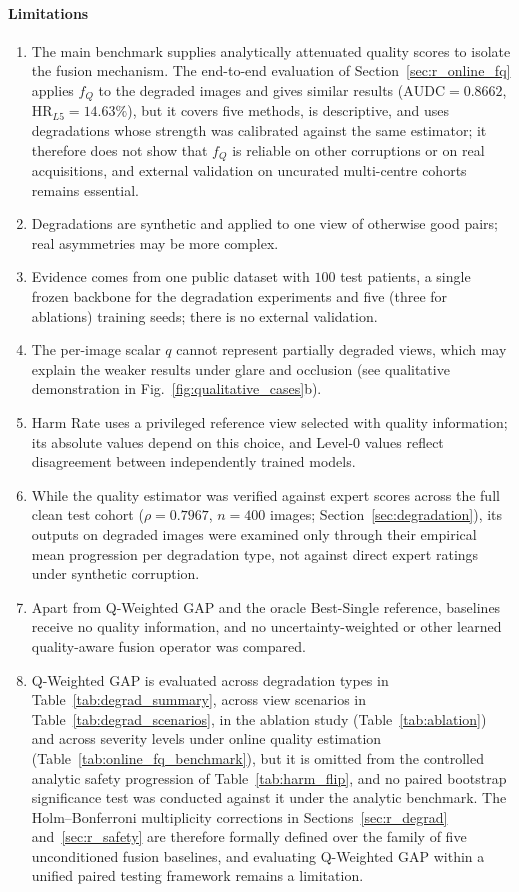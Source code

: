 \documentclass[final,5p,times,twocolumn,authoryear]{elsarticle}
\theoremstyle{plain}
\theoremstyle{remark}
\begin{document}
\paragraph{Limitations}
\begingroup
\renewcommand{\labelenumi}{(\roman{enumi})}
\begin{enumerate}
  \item The main benchmark supplies analytically attenuated quality scores to isolate the fusion mechanism. The end-to-end evaluation of Section~\ref{sec:r_online_fq} applies $f_Q$ to the degraded images and gives similar results ($\text{AUDC} = 0.8662$, $\text{HR}_{L5} = 14.63\%$), but it covers five methods, is descriptive, and uses degradations whose strength was calibrated against the same estimator; it therefore does not show that $f_Q$ is reliable on other corruptions or on real acquisitions, and external validation on uncurated multi-centre cohorts remains essential.
  \item Degradations are synthetic and applied to one view of otherwise good pairs; real asymmetries may be more complex.
  \item Evidence comes from one public dataset with $100$ test patients, a single frozen backbone for the degradation experiments and five (three for ablations) training seeds; there is no external validation.
  \item The per-image scalar $q$ cannot represent partially degraded views, which may explain the weaker results under glare and occlusion (see qualitative demonstration in Fig.~\ref{fig:qualitative_cases}b).
  \item Harm Rate uses a privileged reference view selected with quality information; its absolute values depend on this choice, and Level-0 values reflect disagreement between independently trained models.
  \item While the quality estimator was verified against expert scores across the full clean test cohort ($\rho = 0.7967$, $n=400$ images; Section~\ref{sec:degradation}), its outputs on degraded images were examined only through their empirical mean progression per degradation type, not against direct expert ratings under synthetic corruption.
  \item Apart from Q-Weighted GAP and the oracle Best-Single reference, baselines receive no quality information, and no uncertainty-weighted or other learned quality-aware fusion operator was compared.
  \item Q-Weighted GAP is evaluated across degradation types in Table~\ref{tab:degrad_summary}, across view scenarios in Table~\ref{tab:degrad_scenarios}, in the ablation study (Table~\ref{tab:ablation}) and across severity levels under online quality estimation (Table~\ref{tab:online_fq_benchmark}), but it is omitted from the controlled analytic safety progression of Table~\ref{tab:harm_flip}, and no paired bootstrap significance test was conducted against it under the analytic benchmark. The Holm--Bonferroni multiplicity corrections in Sections~\ref{sec:r_degrad} and~\ref{sec:r_safety} are therefore formally defined over the family of five unconditioned fusion baselines, and evaluating Q-Weighted GAP within a unified paired testing framework remains a limitation.

\end{enumerate}
\end{document}
